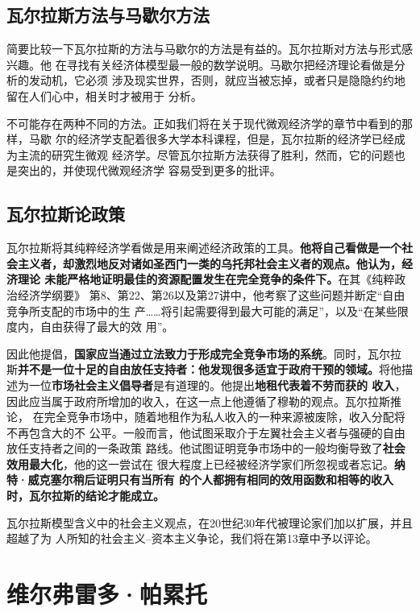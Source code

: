 \subsection{瓦尔拉斯方法与马歇尔方法}

简要比较一下瓦尔拉斯的方法与马歇尔的方法是有益的。瓦尔拉斯对方法与形式感兴趣。他
在寻找有关经济体模型最一般的数学说明。马歇尔把经济理论看做是分析的发动机，它必须
涉及现实世界，否则，就应当被忘掉，或者只是隐隐约约地留在人们心中，相关时才被用于
分析。

不可能存在两种不同的方法。正如我们将在关于现代微观经济学的章节中看到的那样，马歇
尔的经济学支配着很多大学本科课程，但是，瓦尔拉斯的经济学已经成为主流的研究生微观
经济学。尽管瓦尔拉斯方法获得了胜利，然而，它的问题也是突出的，并使现代微观经济学
容易受到更多的批评。

\subsection{瓦尔拉斯论政策}

瓦尔拉斯将其纯粹经济学看做是用来阐述经济政策的工具。\textbf{他将自己看做是一个社
  会主义者，却激烈地反对诸如圣西门一类的乌托邦社会主义者的观点。他认为，经济理论
  未能严格地证明最佳的资源配置发生在完全竞争的条件下。}在其《纯粹政治经济学纲要》
第8、第22、第26以及第27讲中，他考察了这些问题并断定“自由竞争所支配的市场中的生
产……将引起需要得到最大可能的满足”，以及“在某些限度内，自由获得了最大的效
用”。

因此他提倡，\textbf{国家应当通过立法致力于形成完全竞争市场的系统}。同时，瓦尔拉
斯\textbf{并不是一位十足的自由放任支持者：他发现很多适宜于政府干预的领域。}将他描
述为一位\textbf{市场社会主义倡导者}是有道理的。他提出\textbf{地租代表着不劳而获的
  收入}，因此应当属于政府所增加的收入，在这一点上他遵循了穆勒的观点。瓦尔拉斯推论，
在完全竞争市场中，随着地租作为私人收入的一种来源被废除，收入分配将不再包含大的不
公平。一般而言，他试图采取介于左翼社会主义者与强硬的自由放任支持者之间的一条政策
路线。他试图证明竞争市场中的一般均衡导致了\textbf{社会效用最大化}，他的这一尝试在
很大程度上已经被经济学家们所忽视或者忘记。\textbf{纳特·威克塞尔稍后证明只有当所有
  的个人都拥有相同的效用函数和相等的收入时，瓦尔拉斯的结论才能成立。}

瓦尔拉斯模型含义中的社会主义观点，在20世纪30年代被理论家们加以扩展，并且超越了为
人所知的社会主义--资本主义争论，我们将在第13章中予以评论。

\section{维尔弗雷多·帕累托}

